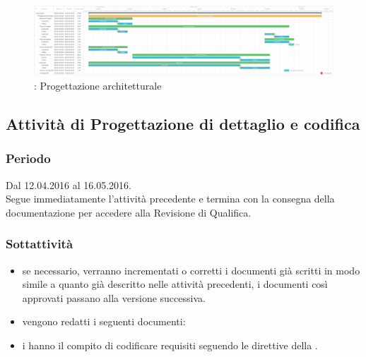 \documentclass[a4paper, titlepage]{article}
\begin{document}
\begin{figure}[!ht]
    \includegraphics[scale=0.2]{Img/Grafici_Gantt/Progettazione_architetturale.pdf}
	\caption{ : Progettazione architetturale}
\end{figure}

\subsection{Attività di Progettazione di dettaglio e codifica }
\subsubsection{Periodo}
Dal 12.04.2016 al 16.05.2016.\\
Segue immediatamente l'attività precedente e termina con la consegna della documentazione per accedere alla Revisione di Qualifica.


\subsubsection{Sottattività}
\begin{itemize}
	\item {} se necessario, verranno incrementati o corretti i documenti già scritti in modo simile a quanto già descritto nelle attività precedenti, i documenti così approvati passano alla versione successiva.
	\item {} vengono redatti i seguenti documenti:
	\item {} i  hanno il compito di codificare  requisiti seguendo le direttive della .		 
\end{itemize}
\end{document}
